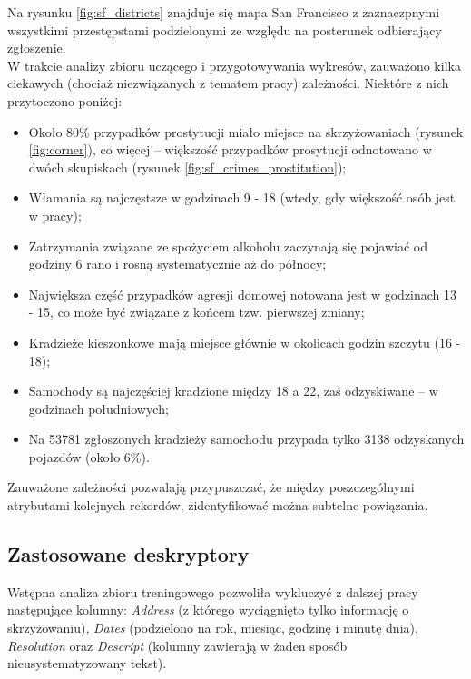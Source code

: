 \documentclass[11pt]{article} %
\begin{document}
Na rysunku \ref{fig:sf_districts} znajduje się mapa San Francisco z zaznaczpnymi wszystkimi przestępstami podzielonymi ze względu na posterunek odbierający zgłoszenie. \\

W trakcie analizy zbioru uczącego i przygotowywania wykresów, zauważono kilka ciekawych (chociaż niezwiązanych z tematem pracy) zależności. Niektóre z nich przytoczono poniżej:

\begin{itemize}
\item Około 80\% przypadków prostytucji miało miejsce na skrzyżowaniach (rysunek \ref{fig:corner}), co więcej -- większość przypadków prosytucji odnotowano w dwóch skupiskach (rysunek \ref{fig:sf_crimes_prostitution});
\item Włamania są najczęstsze w godzinach 9 - 18 (wtedy, gdy większość osób jest w pracy);
\item Zatrzymania związane ze spożyciem alkoholu zaczynają się pojawiać od godziny 6 rano i rosną systematycznie aż do północy;
\item Największa część przypadków agresji domowej notowana jest w godzinach 13 - 15, co może być związane z końcem tzw. pierwszej zmiany;
\item Kradzieże kieszonkowe mają miejsce głównie w okolicach godzin szczytu (16 - 18);
\item Samochody są najczęściej kradzione między 18 a 22, zaś odzyskiwane -- w godzinach południowych;
\item Na 53781 zgłoszonych kradzieży samochodu przypada tylko 3138 odzyskanych pojazdów (około 6\%).
\end{itemize}

Zauważone zależności pozwalają przypuszczać, że między poszczególnymi atrybutami kolejnych rekordów, zidentyfikować można subtelne powiązania. \\


\subsection{Zastosowane deskryptory}

Wstępna analiza zbioru treningowego pozwoliła wykluczyć z dalszej pracy następujące kolumny: \textit{Address} (z którego wyciągnięto tylko informację o skrzyżowaniu), \textit{Dates} (podzielono na rok, miesiąc, godzinę i minutę dnia), \textit{Resolution} oraz \textit{Descript} (kolumny zawierają w żaden sposób nieusystematyzowany tekst). \\
\end{document}
